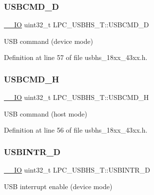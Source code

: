 \subsubsection{\texorpdfstring{U\+S\+B\+C\+M\+D\+\_\+D}{USBCMD\_D}}
{\footnotesize\ttfamily \hyperlink{core__sc300_8h_aec43007d9998a0a0e01faede4133d6be}{\+\_\+\+\_\+\+IO} uint32\+\_\+t L\+P\+C\+\_\+\+U\+S\+B\+H\+S\+\_\+\+T\+::\+U\+S\+B\+C\+M\+D\+\_\+D}

U\+SB command (device mode) 

Definition at line 57 of file usbhs\+\_\+18xx\+\_\+43xx.\+h.

\mbox{\label{struct_l_p_c___u_s_b_h_s___t_a61f328a3a9343dc23f054b2a834123db}} 
\subsubsection{\texorpdfstring{U\+S\+B\+C\+M\+D\+\_\+H}{USBCMD\_H}}
{\footnotesize\ttfamily \hyperlink{core__sc300_8h_aec43007d9998a0a0e01faede4133d6be}{\+\_\+\+\_\+\+IO} uint32\+\_\+t L\+P\+C\+\_\+\+U\+S\+B\+H\+S\+\_\+\+T\+::\+U\+S\+B\+C\+M\+D\+\_\+H}

U\+SB command (host mode) 

Definition at line 56 of file usbhs\+\_\+18xx\+\_\+43xx.\+h.

\mbox{\label{struct_l_p_c___u_s_b_h_s___t_a69db2526568fcdc5e7445076b3e5da8a}} 
\subsubsection{\texorpdfstring{U\+S\+B\+I\+N\+T\+R\+\_\+D}{USBINTR\_D}}
{\footnotesize\ttfamily \hyperlink{core__sc300_8h_aec43007d9998a0a0e01faede4133d6be}{\+\_\+\+\_\+\+IO} uint32\+\_\+t L\+P\+C\+\_\+\+U\+S\+B\+H\+S\+\_\+\+T\+::\+U\+S\+B\+I\+N\+T\+R\+\_\+D}

U\+SB interrupt enable (device mode) 

